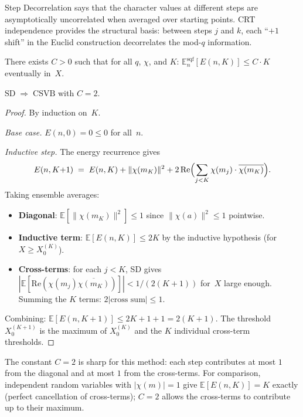 Step Decorrelation says that the character values at different steps are
asymptotically uncorrelated when averaged over starting points.  CRT
independence provides the structural basis: between steps $j$ and $k$,
each ``$+1$ shift'' in the Euclid construction decorrelates the mod-$q$
information.

\begin{property}
There exists $C > 0$ such that for all $q$, $\chi$, and $K$:
$\mathbb{E}_{n}^{\mathrm{sqf}}[E(n, K)] \leq C \cdot K$
eventually in~$X$.
\end{property}

\begin{theorem}
\label{thm:variance-bound}
$\mathrm{SD} \;\Longrightarrow\; \mathrm{CSVB}$ with $C = 2$.
\end{theorem}

\begin{proof}
By induction on~$K$.

\emph{Base case.}  $E(n, 0) = 0 \leq 0$ for all~$n$.

\emph{Inductive step.}  The energy recurrence gives
\[
  E(n, K{+}1) \;=\; E(n, K) + \|\chi(m_K)\|^2 +
  2\,\mathrm{Re}\Bigl(\sum_{j < K} \chi(m_j) \cdot \overline{\chi(m_K)}\Bigr).
\]
Taking ensemble averages:
\begin{itemize}[nosep]
\item \textbf{Diagonal}: $\mathbb{E}[\|\chi(m_K)\|^2] \leq 1$ since
  $\|\chi(a)\|^2 \leq 1$ pointwise.
\item \textbf{Inductive term}: $\mathbb{E}[E(n, K)] \leq 2K$ by the
  inductive hypothesis (for $X \geq X_0^{(K)}$).
\item \textbf{Cross-terms}: for each $j < K$, SD gives
  $|\mathbb{E}[\mathrm{Re}(\chi(m_j)\overline{\chi(m_K)})]|
  < 1/(2(K{+}1))$ for~$X$ large enough.
  Summing the $K$ terms: $2|\text{cross sum}| \leq 1$.
\end{itemize}
Combining: $\mathbb{E}[E(n, K{+}1)] \leq 2K + 1 + 1 = 2(K{+}1)$.
The threshold $X_0^{(K+1)}$ is the maximum of $X_0^{(K)}$ and the $K$
individual cross-term thresholds.
\end{proof}

The constant $C = 2$ is sharp for this method: each step contributes
at most $1$ from the diagonal and at most $1$ from the cross-terms.
For comparison, independent random variables with $|\chi(m)| = 1$ give
$\mathbb{E}[E(n, K)] = K$ exactly (perfect cancellation of
cross-terms); $C = 2$ allows the cross-terms to contribute up to their
maximum.

